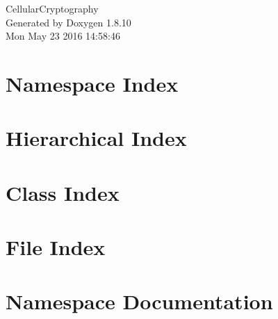 \documentclass[twoside]{book}
\newcommand{\+}{\discretionary{\mbox{\scriptsize$\hookleftarrow$}}{}{}}
\newcommand{\clearemptydoublepage}{%
  \newpage{\pagestyle{empty}\cleardoublepage}%
}
\begin{document}
\hypersetup{pageanchor=false,
             bookmarks=true,
             bookmarksnumbered=true,
             pdfencoding=unicode
            }
\begin{titlepage}
\vspace*{7cm}
\begin{center}%
{\Large Cellular\+Cryptography }\\
\vspace*{1cm}
{\large Generated by Doxygen 1.8.10}\\
\vspace*{0.5cm}
{\small Mon May 23 2016 14:58:46}\\
\end{center}
\end{titlepage}
\clearemptydoublepage
\tableofcontents
\clearemptydoublepage
{}
\hypersetup{pageanchor=true}

\chapter{Namespace Index}

\chapter{Hierarchical Index}

\chapter{Class Index}

\chapter{File Index}

\chapter{Namespace Documentation}







\end{document}
